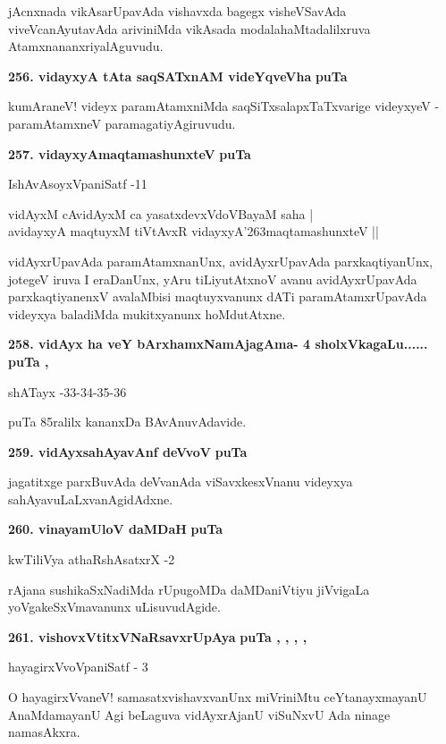 \smallskip
jAcnxnada vikAsarUpavAda vishavxda bagegx visheVSavAda viveVcanAyutavAda ariviniMda vikAsada modalahaMtadalilxruva AtamxnananxriyalAguvudu.

\medskip
\noindent
\textbf{256. vidayxyA tAta saqSATxnAM videYqveVha} \hfill{\bf puTa \pageref{86a}}

\smallskip
kumAraneV! videyx paramAtamxniMda saqSiTxsalapxTaTxvarige videyxyeV - paramAtamxneV paramagatiyAgiruvudu.

\medskip
\noindent
\textbf{257. vidayxyAmaqtamashunxteV} \hfill{\bf puTa \pageref{86e}}

\hfill{IshAvAsoyxVpaniSatf -11}

\begin{shloka}
vidAyxM cAvidAyxM ca yasatxdevxVdoVBayaM saha |\\
avidayxyA maqtuyxM tiVtAvxR vidayxyA\char'263maqtamashunxteV ||
\end{shloka}

\smallskip
vidAyxrUpavAda paramAtamxnanUnx, avidAyxrUpavAda parxkaqtiyanUnx, jotegeV iruva I eraDanUnx, yAru tiLiyutAtxnoV avanu avidAyxrUpavAda parxkaqtiyanenxV avalaMbisi maqtuyxvanunx dATi paramAtamxrUpavAda videyxya baladiMda mukitxyanunx hoMdutAtxne.

\medskip
\noindent
\textbf{258. vidAyx ha veY bArxhamxNamAjagAma- 4 sholxVkagaLu......} \hfill{\bf puTa \pageref{48}, \pageref{85}}

\hfill{shATayx -33-34-35-36}

\smallskip
puTa 85ralilx kananxDa BAvAnuvAdavide.

\medskip
\noindent
\textbf{259. vidAyxsahAyavAnf deVvoV} \hfill{\bf puTa \pageref{86c}}

\smallskip
jagatitxge parxBuvAda deVvanAda viSavxkesxVnanu videyxya sahAyavuLaLxvanAgidAdxne.

\medskip
\noindent
\textbf{260. vinayamUloV daMDaH} \hfill{\bf puTa \pageref{93}}

\hfill{kwTiliVya athaRshAsatxrX -2}

\smallskip
rAjana sushikaSxNadiMda rUpugoMDa daMDaniVtiyu jiVvigaLa yoVgakeSxVmavanunx uLisuvudAgide.

\medskip
\noindent
\textbf{261. vishovxVtitxVNaRsavxrUpAya} \hfill{\bf puTa \pageref{page19c}, \pageref{65}, \pageref{69}, \pageref{102e}, \pageref{128}}

\hfill{hayagirxVvoVpaniSatf - 3}

\smallskip
O hayagirxVvaneV! samasatxvishavxvanUnx miVriniMtu ceYtanayxmayanU AnaMdamayanU Agi beLaguva vidAyxrAjanU viSuNxvU Ada ninage namasAkxra.

